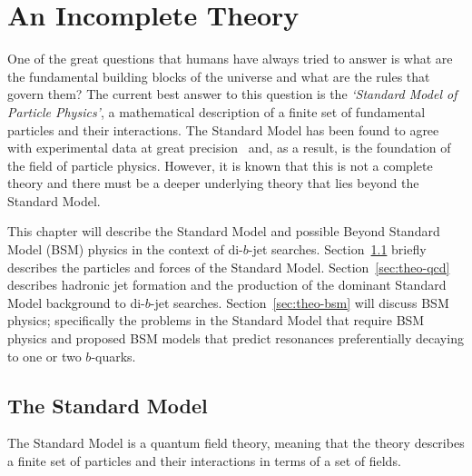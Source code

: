 \chapter{An Incomplete Theory}
\label{sec:theo}

One of the great questions that humans have always tried to answer is
what are the fundamental building blocks of the universe and what are the rules that govern them?
%
The current best answer to this question is the \textit{`Standard Model of Particle Physics'},
a mathematical description of a finite set of fundamental particles and their interactions.
The Standard Model has been found to agree with experimental data at great precision~\cite{theo-ewTests}
and, as a result, is the foundation of the field of particle physics.
However, it is known that this is not a complete theory and there must be
a deeper underlying theory that lies beyond the Standard Model.

This chapter will describe the Standard Model and
possible Beyond Standard Model (BSM) physics in the context of di-$b$-jet searches.
Section~\ref{sec:theo-sm} briefly describes the particles and forces of the Standard Model.
Section~\ref{sec:theo-qcd} describes hadronic jet formation and the production of the dominant Standard Model background to di-$b$-jet searches.
Section~\ref{sec:theo-bsm} will discuss BSM physics;
specifically the problems in the Standard Model that require BSM physics
and proposed BSM models that predict resonances preferentially decaying to one or two $b$-quarks.

\section{The Standard Model}
\label{sec:theo-sm}

The Standard Model is a quantum field theory,
meaning that the theory describes a finite set of particles and their interactions in
terms of a set of fields.


